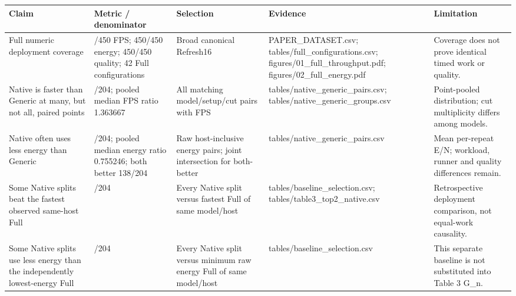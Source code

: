 \begin{longtable}{@{}>{\raggedright\arraybackslash}p{.18\linewidth}>{\raggedright\arraybackslash}p{.19\linewidth}>{\raggedright\arraybackslash}p{.17\linewidth}>{\raggedright\arraybackslash}p{.19\linewidth}>{\raggedright\arraybackslash}p{.17\linewidth}@{}}
\toprule
Claim & Metric / denominator & Selection & Evidence & Limitation \\ \midrule \endhead
Full numeric deployment coverage & 450/\allowbreak{}450 FPS; 450/\allowbreak{}450 energy; 450/\allowbreak{}450 quality; 42 Full configurations & Broad canonical Refresh16 & PAPER\_\allowbreak{}DATASET.csv; tables/\allowbreak{}full\_\allowbreak{}configurations.csv; figures/\allowbreak{}01\_\allowbreak{}full\_\allowbreak{}throughput.pdf; figures/\allowbreak{}02\_\allowbreak{}full\_\allowbreak{}energy.pdf & Coverage does not prove identical timed work or quality. \\
Native is faster than Generic at many, but not all, paired points & 139/\allowbreak{}204; pooled median FPS ratio 1.363667 & All matching model/\allowbreak{}setup/\allowbreak{}cut pairs with FPS & tables/\allowbreak{}native\_\allowbreak{}generic\_\allowbreak{}pairs.csv; tables/\allowbreak{}native\_\allowbreak{}generic\_\allowbreak{}groups.csv & Point-pooled distribution; cut multiplicity differs among models. \\
Native often uses less energy than Generic & 160/\allowbreak{}204; pooled median energy ratio 0.755246; both better 138/\allowbreak{}204 & Raw host-inclusive energy pairs; joint intersection for both-better & tables/\allowbreak{}native\_\allowbreak{}generic\_\allowbreak{}pairs.csv & Mean per-repeat E/\allowbreak{}N; workload, runner and quality differences remain. \\
Some Native splits beat the fastest observed same-host Full & 94/\allowbreak{}204 & Every Native split versus fastest Full of same model/\allowbreak{}host & tables/\allowbreak{}baseline\_\allowbreak{}selection.csv; tables/\allowbreak{}table3\_\allowbreak{}top2\_\allowbreak{}native.csv & Retrospective deployment comparison, not equal-work causality. \\
Some Native splits use less energy than the independently lowest-energy Full & 82/\allowbreak{}204 & Every Native split versus minimum raw energy Full of same model/\allowbreak{}host & tables/\allowbreak{}baseline\_\allowbreak{}selection.csv & This separate baseline is not substituted into Table 3 G\_\allowbreak{}n. \\

\end{longtable}
